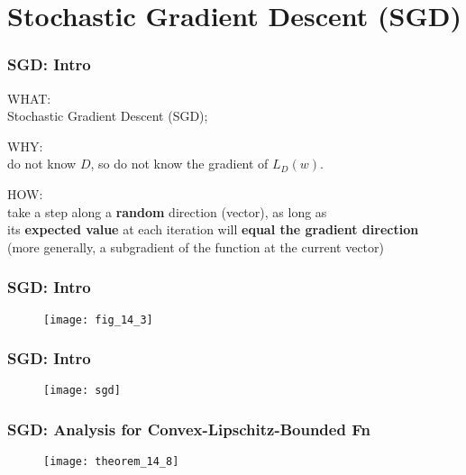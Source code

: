 \section{Stochastic Gradient Descent (SGD)}

\begin{frame}
\frametitle{SGD: Intro}

WHAT:\\
Stochastic Gradient Descent (SGD);
\vspace{5mm}

WHY:\\
do not know $D$, so do not know the gradient of $L_D(w)$.
\vspace{5mm}

HOW:\\
take a step along a \textbf{random} direction (vector), as long as \\
its \textbf{expected value} at each iteration will \textbf{equal the gradient direction} \\
(more generally, a subgradient of the function at the current vector)
\end{frame}

\begin{frame}
\frametitle{SGD: Intro}

\begin{figure}
    \centering
    \texttt{[image: fig\_14\_3]}
\end{figure}

\end{frame}

\begin{frame}
\frametitle{SGD: Intro}

\begin{figure}
    \centering
    \texttt{[image: sgd]}
\end{figure}

\end{frame}



\begin{frame}
\frametitle{SGD: Analysis for Convex-Lipschitz-Bounded Fn}

\begin{figure}
    \centering
    \texttt{[image: theorem\_14\_8]}
\end{figure}

\end{frame}
